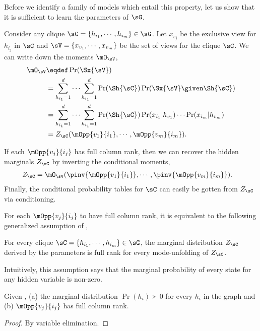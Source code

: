Before we identify a family of models which entail this property, let us
  show that it is sufficient to learn the parameters of $\sG$.

Consider any clique $\sC = \{h_{i_1}, \cdots, h_{i_m}\} \in \sG$. Let $x_{v_j}$ be the exclusive
  view for $h_{i_j}$ in $\sC$ and $\sV = \{x_{v_1}, \cdots, x_{v_m}\}$
  be the set of views for the clique $\sC$.
We can write down the moments $\mO_\sV$,
\begin{align*}
  \mO_\sV 
  &\eqdef \Pr(\Sx{\sV}) \\
  &= \sum_{h_{i_1} = 1}^{d} \cdots \sum_{h_{i_1} = 1}^{d} 
      \Pr(\Sh{\sC}) \Pr(\Sx{\sV} \given \Sh{\sC}) \\
      &= \sum_{h_{i_1} = 1}^{d} \cdots \sum_{h_{i_1} = 1}^{d} \Pr(\Sh{\sC}) 
          \Pr(x_{i_1} | h_{v_1}) \cdots \Pr(x_{i_m} | h_{v_m}) \\
    &= Z_{\sC}(\mOpp{v_1}{i_1},\cdots,\mOpp{v_m}{i_m}).
\end{align*}

If each $\mOpp{v_j}{i_j}$ has full column rank, then we can recover the
hidden marginals $Z_\sC$ by inverting the conditional moments,
\begin{align*}
  Z_{\sC} &= \mO_\sV(\pinv{\mOpp{v_1}{i_1}},\cdots,\pinv{\mOpp{v_m}{i_m}}).
\end{align*}
Finally, the conditional probability tables for $\sC$ can easily be gotten from
  $Z_\sC$ via conditioning.

For each $\mOpp{v_j}{i_j}$ to have full column rank, it is equivalent
  to the following generalized assumption of
  ,

\begin{assumption} 
  \label{asm:full-rank-plus}
  For every clique $\sC = \{h_{i_1}, \cdots, h_{i_m}\} \in \sG$, the
  marginal distribution $Z_\sC$ derived by the parameters is full rank
  for every mode-unfolding of $Z_\sC$.
\end{assumption}

Intuitively, this assumption says that the marginal probability of every state for any hidden variable is non-zero.

\begin{lemma}
  \label{lem:goodness}

  Given , (a) the marginal distribution
  $\Pr(h_i) \succ 0$ for every $h_i$ in the graph and (b)
  $\mOpp{v_j}{i_j}$ has full column rank.
\end{lemma}
\begin{proof}
  By variable elimination.
\end{proof}

